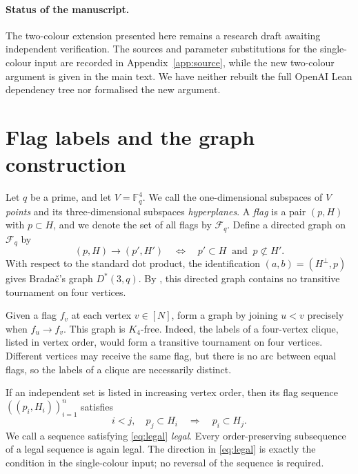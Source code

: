 \documentclass[11pt]{article}
\theoremstyle{definition}
\theoremstyle{remark}
\newcommand{\F}{\mathcal F_q}
\newcommand{\FF}{\mathbb F}
\newcommand{\src}[1]{\ifmmode\text{\texttt{\detokenize{#1}}}\else\texttt{\detokenize{#1}}\fi}
\begin{document}
\paragraph{Status of the manuscript.}
The two-colour extension presented here remains a research draft
awaiting independent verification. The sources and parameter
substitutions for the single-colour input are recorded in
Appendix~\ref{app:source}, while the new two-colour argument is given in
the main text. We have neither rebuilt the full OpenAI Lean dependency
tree nor formalised the new argument.

\section{Flag labels and the graph construction}\label{sec:flags}

Let $q$ be a prime, and let $V=\FF_q^4$. We call the one-dimensional
subspaces of $V$ \emph{points} and its three-dimensional subspaces
\emph{hyperplanes}. A \emph{flag} is a pair $(p,H)$ with $p\subset H$,
and we denote the set of all flags by $\F$. Define a directed graph on
$\F$ by
\begin{equation}\label{eq:arc}
 (p,H)\longrightarrow(p',H')
 \quad\Longleftrightarrow\quad
 p'\subset H\ \text{ and }\ p\not\subset H'.
\end{equation}
With respect to the standard dot product, the identification
$(a,b)=(H^\perp,p)$ gives Brada\v{c}'s graph $D^*(3,q)$. By
\cite[Lemma~2.11, with parameter~$3$]{Bradac}, this directed graph
contains no transitive tournament on four vertices.

Given a flag $f_v$ at each vertex $v\in[N]$, form a graph by joining
$u<v$ precisely when $f_u\to f_v$. This graph is $K_4$-free. Indeed,
the labels of a four-vertex clique, listed in vertex order, would form
a transitive tournament on four vertices. Different vertices may
receive the same flag, but there is no arc between equal flags, so the
labels of a clique are necessarily distinct.

If an independent set is listed in increasing vertex order, then its
flag sequence $((p_i,H_i))_{i=1}^n$ satisfies
\begin{equation}\label{eq:legal}
 i<j,\quad p_j\subset H_i
 \quad\Longrightarrow\quad p_i\subset H_j.
\end{equation}
We call a sequence satisfying \eqref{eq:legal} \emph{legal}. Every
order-preserving subsequence of a legal sequence is again legal. The
direction in \eqref{eq:legal} is exactly the condition
\src{ScanConsistent} in the single-colour input; no reversal of the
sequence is required.
\end{document}
